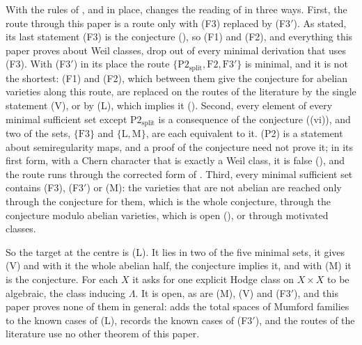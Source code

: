 \begin{remark}\label{rem:bullseye}
With the rules of ,  and
 in place,  changes the reading of
 in three ways. First, the route through this paper is
a route only with (F3) replaced by \textup{(F3$'$)}. As stated, its last
statement (F3) is the conjecture (), so (F1) and (F2), and
everything this paper proves about Weil classes, drop out of every minimal
derivation that uses (F3). With \textup{(F3$'$)} in its place the route
$\{\mathrm{P2}_{\mathrm{split}},\mathrm{F2},\mathrm{F3}'\}$ is minimal, and it is not the
shortest: (F1) and (F2), which between them give the conjecture for abelian
varieties along this route, are replaced on the routes of the literature by
the single statement \textup{(V)}, or by \textup{(L)}, which implies it
(). Second, every element of every minimal sufficient set
except $\mathrm{P2}_{\mathrm{split}}$ is a consequence of the conjecture
((vi)), and
two of the sets, $\{\mathrm{F3}\}$ and $\{\mathrm{L},\mathrm{M}\}$, are
each equivalent to it. (P2) is a statement about semiregularity maps, and a
proof of the conjecture need not prove it; in its first form, with a Chern
character that is exactly a Weil class, it is false (), and
the route runs through the corrected form of . Third, every minimal sufficient set
contains (F3), \textup{(F3$'$)} or \textup{(M)}: the varieties that are not
abelian are reached only through the conjecture for them, which is the whole
conjecture, through the conjecture modulo abelian varieties, which is open
(), or through motivated classes.

So the target at the centre is \textup{(L)}. It lies in two of the five
minimal sets, it gives \textup{(V)} and with it the whole abelian half, the
conjecture implies it, and with \textup{(M)} it is the conjecture. For each
$X$ it asks for one explicit Hodge class on $X\times X$ to be algebraic, the
class inducing $\Lambda$. It is open, as are \textup{(M)}, \textup{(V)}
and \textup{(F3$'$)}, and this paper proves none of them in general:
 adds the total spaces of Mumford families to the
known cases of \textup{(L)},  records the known cases of
\textup{(F3$'$)}, and the routes of the literature use no other theorem of
this paper.
\end{remark}

